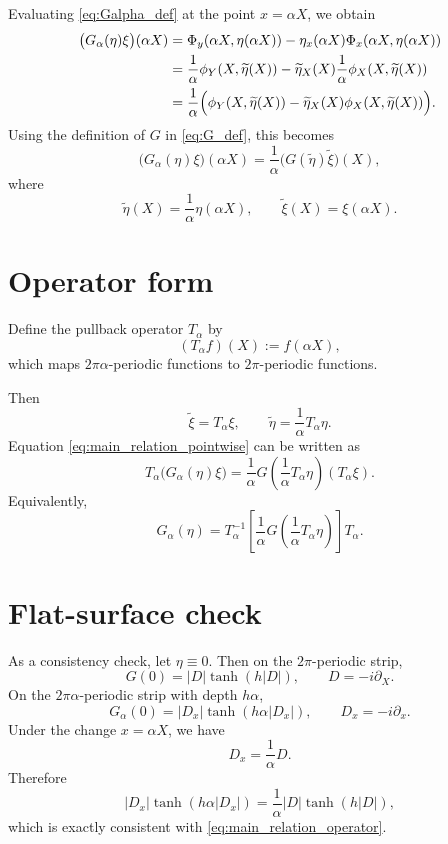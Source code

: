 \documentclass[11pt]{article}
\begin{document}
Evaluating \eqref{eq:Galpha_def} at the point $x=\alpha X$, we obtain
\begin{align*}
\bigl(G_\alpha(\eta)\xi\bigr)(\alpha X)
&=
\Phi_y(\alpha X,\eta(\alpha X))
-
\eta_x(\alpha X)\Phi_x(\alpha X,\eta(\alpha X))\\
&=
\frac{1}{\alpha}\phi_Y(X,\widetilde{\eta}(X))
-
\widetilde{\eta}_X(X)\frac{1}{\alpha}\phi_X(X,\widetilde{\eta}(X))\\
&=
\frac{1}{\alpha}
\Bigl(
\phi_Y(X,\widetilde{\eta}(X))
-
\widetilde{\eta}_X(X)\phi_X(X,\widetilde{\eta}(X))
\Bigr).
\end{align*}
Using the definition of $G$ in \eqref{eq:G_def}, this becomes
\begin{equation}
\boxed{
\bigl(G_\alpha(\eta)\xi\bigr)(\alpha X)
=
\frac{1}{\alpha}
\bigl(G(\widetilde{\eta})\widetilde{\xi}\bigr)(X),
}
\label{eq:main_relation_pointwise}
\end{equation}
where
\[
\widetilde{\eta}(X)=\frac{1}{\alpha}\eta(\alpha X),
\qquad
\widetilde{\xi}(X)=\xi(\alpha X).
\]

\section{Operator form}

Define the pullback operator $T_\alpha$ by
\[
(T_\alpha f)(X):=f(\alpha X),
\]
which maps $2\pi\alpha$-periodic functions to $2\pi$-periodic functions.

Then
\[
\widetilde{\xi}=T_\alpha \xi,
\qquad
\widetilde{\eta}=\frac{1}{\alpha}T_\alpha \eta.
\]
Equation \eqref{eq:main_relation_pointwise} can be written as
\begin{equation}
\boxed{
T_\alpha\bigl(G_\alpha(\eta)\xi\bigr)
=
\frac{1}{\alpha}
G\!\left( \frac{1}{\alpha}T_\alpha \eta \right)(T_\alpha \xi).
}
\label{eq:main_relation_operator}
\end{equation}
Equivalently,
\begin{equation}
\boxed{
G_\alpha(\eta)
=
T_\alpha^{-1}
\left[
\frac{1}{\alpha}
G\!\left( \frac{1}{\alpha}T_\alpha \eta \right)
\right]
T_\alpha.
}
\label{eq:main_relation_conjugation}
\end{equation}

\section{Flat-surface check}

As a consistency check, let $\eta\equiv 0$. Then on the $2\pi$-periodic strip,
\[
G(0)=|D|\tanh(h|D|),
\qquad D=-i\partial_X.
\]
On the $2\pi\alpha$-periodic strip with depth $h\alpha$,
\[
G_\alpha(0)=|D_x|\tanh(h\alpha |D_x|),
\qquad D_x=-i\partial_x.
\]
Under the change $x=\alpha X$, we have
\[
D_x=\frac{1}{\alpha}D.
\]
Therefore
\[
|D_x|\tanh(h\alpha |D_x|)
=
\frac{1}{\alpha}|D|\tanh(h|D|),
\]
which is exactly consistent with \eqref{eq:main_relation_operator}.
\end{document}
